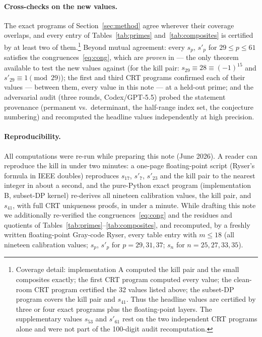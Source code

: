 \documentclass[10pt]{article}
\theoremstyle{remark}
\begin{document}
\paragraph{Cross-checks on the new values.}
The exact programs of Section~\ref{sec:method} agree wherever their
coverage overlaps, and every entry of Tables~\ref{tab:primes}
and~\ref{tab:composites} is certified by at least two of
them.\footnote{Coverage detail: implementation A computed the kill pair
and the small composites exactly; the first CRT program computed every
value; the clean-room CRT program certified the 32 values listed above;
the subset-DP program covers the kill pair and $s_{41}$. Thus the headline
values are certified by three or four exact programs plus the
floating-point layers. The supplementary values $s_{53}$ and $s'_{61}$
rest on the two independent CRT programs alone and were not part of the
100-digit audit recomputation.} Beyond
mutual agreement: every $s_p$, $s'_p$ for $29\le p\le 61$ satisfies the
congruences~\eqref{eq:cong}, which are \emph{proven} in \cite{Sun2021} ---
the only theorem available to test the new values against (for the kill
pair: $s_{29}\equiv 28\equiv(-1)^{15}$ and $s'_{29}\equiv 1\pmod{29}$); the
first and third CRT programs confirmed each of their values --- between
them, every value in this note --- at a held-out prime; and the adversarial
audit (three rounds, Codex/GPT-5.5) probed the statement provenance
(permanent vs.\ determinant, the half-range index set, the conjecture
numbering) and recomputed the headline values independently at high
precision.

\paragraph{Reproducibility.}
All computations were re-run while preparing this note (June 2026). A
reader can reproduce the kill in under two minutes: a one-page
floating-point script (Ryser's formula in IEEE doubles) reproduces
$s_{17}$, $s'_7$, $s'_{23}$ and the kill pair to the nearest integer in
about a second, and the pure-Python
exact program (implementation B, subset-DP kernel) re-derives all nineteen
calibration values, the kill pair, and $s_{41}$, with full CRT uniqueness
proofs, in under a minute. While drafting this note we additionally
re-verified the congruences~\eqref{eq:cong} and the residues and quotients
of Tables~\ref{tab:primes}--\ref{tab:composites}, and recomputed, by a
freshly written floating-point Gray-code Ryser, every table entry with
$m\le 18$ (all nineteen calibration values; $s_p$, $s'_p$ for
$p=29,31,37$; $s_n$ for $n=25,27,33,35$).
\end{document}
